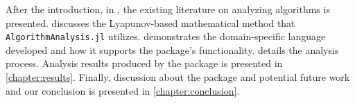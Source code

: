 
After the introduction, in , the existing literature on analyzing algorithms is presented.  discusses the Lyapunov-based mathematical method that \texttt{Algorithm\allowbreak Analysis.jl} utilizes.  demonstrates the domain-specific language developed and how it supports the package's functionality.  details the analysis process. Analysis results produced by the package is presented in \cref{chapter:results}. Finally, discussion about the package and potential future work and our conclusion is presented in \cref{chapter:conclusion}.

